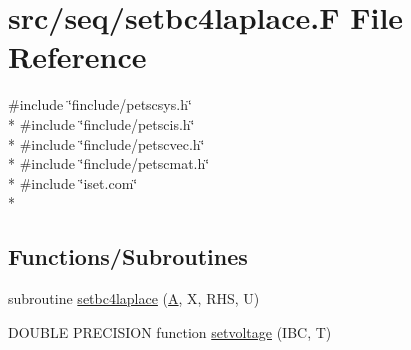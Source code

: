 \hypertarget{seq_2setbc4laplace_8_f}{\section{src/seq/setbc4laplace.F File Reference}
\label{seq_2setbc4laplace_8_f}
}
{\ttfamily \#include \char`\"{}finclude/petscsys.\-h\char`\"{}}\\*
{\ttfamily \#include \char`\"{}finclude/petscis.\-h\char`\"{}}\\*
{\ttfamily \#include \char`\"{}finclude/petscvec.\-h\char`\"{}}\\*
{\ttfamily \#include \char`\"{}finclude/petscmat.\-h\char`\"{}}\\*
{\ttfamily \#include \char`\"{}iset.\-com\char`\"{}}\\*
\subsection*{Functions/\-Subroutines}
\begin{DoxyCompactItemize}
\item 
subroutine \hyperlink{seq_2setbc4laplace_8_f_acc7b5be1aea767a3abd221d63ceb5a1e}{setbc4laplace} (\hyperlink{ibc2_8com_ad2108d58343608772fff791c23da58f5}{A}, X, R\-H\-S, U)
\item 
D\-O\-U\-B\-L\-E P\-R\-E\-C\-I\-S\-I\-O\-N function \hyperlink{seq_2setbc4laplace_8_f_a8173a72444957b131275830439be56b1}{setvoltage} (I\-B\-C, T)
\end{DoxyCompactItemize}



